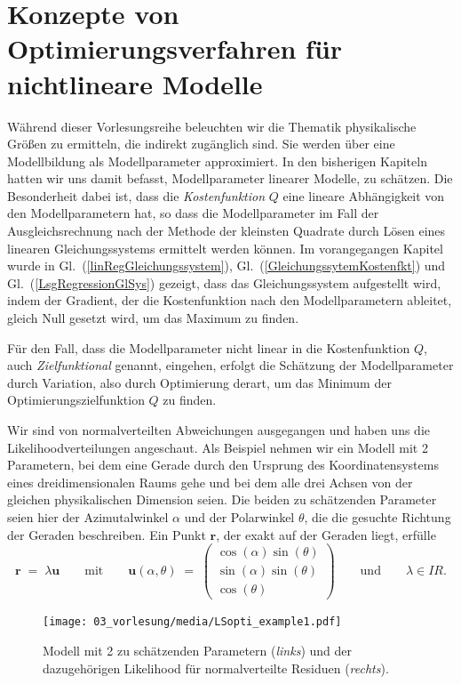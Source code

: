 \section{Konzepte von Optimierungsverfahren für nichtlineare Modelle}
Während dieser Vorlesungsreihe beleuchten wir die Thematik physikalische Größen zu ermitteln, die
indirekt zugänglich sind. Sie werden über eine Modellbildung als Modellparameter approximiert.
In den bisherigen Kapiteln hatten wir uns damit befasst, Modellparameter linearer Modelle, zu schätzen.
Die Besonderheit dabei ist, dass die \textsl{Kostenfunktion} $Q$ eine lineare Abhängigkeit von den
Modellparametern hat, so dass die Modellparameter
im Fall der Ausgleichsrechnung nach der Methode der kleinsten Quadrate durch Lösen eines 
linearen Gleichungssystems ermittelt werden können.
Im vorangegangen Kapitel wurde in Gl.~(\ref{linRegGleichungssystem}), Gl.~(\ref{GleichungssytemKostenfkt})
 und Gl.~(\ref{LsgRegressionGlSys}) gezeigt, dass das Gleichungssystem
aufgestellt wird, indem der Gradient, der die Kostenfunktion nach den Modellparametern ableitet, gleich Null
gesetzt wird, um das Maximum zu finden.

Für den Fall, dass die Modellparameter nicht linear in die Kostenfunktion $Q$,
auch \textsl{Zielfunktional} genannt, eingehen,
erfolgt die Schätzung der Modellparameter durch Variation, also durch Optimierung derart, um
das Minimum der Optimierungszielfunktion $Q$ zu finden.

Wir sind von normalverteilten Abweichungen ausgegangen und haben uns
die Likelihoodverteilungen angeschaut. Als Beispiel nehmen wir ein Modell mit 2 Parametern, bei
dem eine Gerade durch den Ursprung des Koordinatensystems eines dreidimensionalen
Raums gehe und bei dem alle drei Achsen von der gleichen physikalischen Dimension seien.
Die beiden zu schätzenden Parameter seien hier der Azimutalwinkel $\alpha$ und der 
Polarwinkel $\theta$, die die gesuchte Richtung der Geraden beschreiben.
Ein Punkt $\mathbf{r}$, der exakt auf der Geraden liegt, erfülle
\begin{equation}
\mathbf{r} \; = \; \lambda \mathbf{u} \qquad \mathrm{mit} \qquad
\mathbf{u}(\alpha,\theta) \; = \; \left(\begin{array}{c}
\cos(\alpha) \sin(\theta)\\
\sin(\alpha) \sin(\theta)\\
\cos(\theta) \end{array}\right) \qquad \mathrm{und} \qquad \lambda \in I \!\! R.
\end{equation}
\begin{figure}
\begin{center}
\texttt{[image: 03\_vorlesung/media/LSopti\_example1.pdf]}
\end{center}
\caption{Modell mit 2 zu schätzenden Parametern (\textsl{links}) und der dazugehörigen
Likelihood für normalverteilte Residuen (\textsl{rechts}).\label{LSoptiExample1}}
\end{figure}

